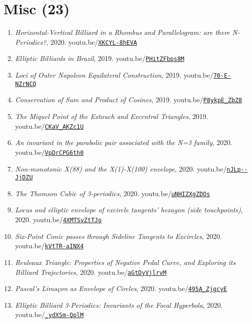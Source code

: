 \documentclass[12pt]{article}
\begin{document}
\section{Misc (23)}

\begin{enumerate}[resume]
\item \textit{Horizontal-Vertical Billiard in a Rhombus and Parallelogram: are there N-Periodics?}, 2020. youtu.be/\href{https://youtu.be/XKCYL-8hEVA}{\nolinkurl{XKCYL-8hEVA}}
\item \textit{Elliptic Billiards in Brazil}, 2019. youtu.be/\href{https://youtu.be/PHitZFbps8M}{\nolinkurl{PHitZFbps8M}}
\item \textit{Loci of Outer Napoleon Equilateral Construction}, 2019. youtu.be/\href{https://youtu.be/70-E-NZrNCQ}{\nolinkurl{70-E-NZrNCQ}}
\item \textit{Conservation of Sum and Product of Cosines}, 2019. youtu.be/\href{https://youtu.be/P8ykpE_ZbZ8}{\nolinkurl{P8ykpE\_ZbZ8}}
\item \textit{The Miquel Point of the Extouch and Excentral Triangles}, 2019. youtu.be/\href{https://youtu.be/CKaV_AKZc1U}{\nolinkurl{CKaV\_AKZc1U}}
\item \textit{An invariant in the parabolic pair associated with the N=3 family}, 2020. youtu.be/\href{https://youtu.be/VpDrCPG6th0}{\nolinkurl{VpDrCPG6th0}}
\item \textit{Non-monotonic X(88) and the X(1)-X(100) envelope}, 2020. youtu.be/\href{https://youtu.be/nJLp--JjDZU}{\nolinkurl{nJLp--JjDZU}}
\item \textit{The Thomson Cubic of 3-periodics}, 2020. youtu.be/\href{https://youtu.be/uNHIZXgZDOs}{\nolinkurl{uNHIZXgZDOs}}
\item \textit{Locus and elliptic envelope of excircle tangents' hexagon (side touchpoints)}, 2020. youtu.be/\href{https://youtu.be/4XMTSvZtTJo}{\nolinkurl{4XMTSvZtTJo}}
\item \textit{Six-Point Conic passes through Sideline Tangents to Excircles}, 2020. youtu.be/\href{https://youtu.be/kVtTR-aINX4}{\nolinkurl{kVtTR-aINX4}}
\item \textit{Reuleaux Triangle: Properties of Negative Pedal Curve, and Exploring its Billiard Trajectories}, 2020. youtu.be/\href{https://youtu.be/aGtDyVjlrvM}{\nolinkurl{aGtDyVjlrvM}}
\item \textit{Pascal's Limaçon as Envelope of Circles}, 2020. youtu.be/\href{https://youtu.be/495A_ZjgcyE}{\nolinkurl{495A\_ZjgcyE}}
\item \textit{Elliptic Billiard 3-Periodics: Invariants of the Focal Hyperbola}, 2020. youtu.be/\href{https://youtu.be/_ydXSm-QplM}{\nolinkurl{\_ydXSm-QplM}}

\end{enumerate}
\end{document}
